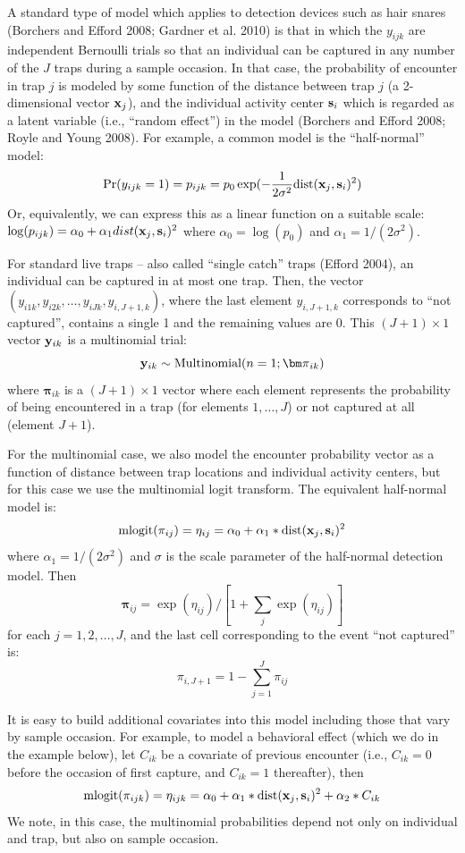 A standard type of model which applies to detection devices such as
hair snares (Borchers and Efford 2008; Gardner et al. 2010) is that in
which the $y_{ijk}$ are independent Bernoulli trials so that an
individual can be captured in any number of the $J$ traps during a
sample occasion.  In that case, the probability of encounter in trap
$j$ is modeled by some function of the distance between trap $j$ (a
2-dimensional vector
${\bf x}_{j}$),  and
the individual activity center ${\bf s}_{i}$ which is regarded as a
latent variable (i.e., ``random effect'') in the model (Borchers and
Efford 2008; Royle and Young 2008). For example, a common model is the
``half-normal'' model:
\[
\Pr(y_{ijk}  = 1) =
p_{ijk} = 
 p_{0} \exp( -\frac{1}{2\sigma^{2}} 
\mbox{dist}({\bf  x}_{j},{\bf s}_{i})^2 )
\]
Or, equivalently,  we can express this as a linear function on a suitable scale:
$\log(p_{ijk}) = \alpha_{0} + \alpha_{1}dist({\bf  x}_{j},{\bf
   s}_{i})^2$
where $\alpha_{0} = \log(p_{0})$ and $\alpha_{1}= 1/(2\sigma^2)$.

For standard live traps -- also called ``single catch'' traps (Efford
2004), an individual can be captured in at most one trap. Then, the
vector $(y_{i1k},y_{i2k},\ldots,y_{iJk},y_{i,J+1,k})$, where the last
element $y_{i,J+1,k}$ corresponds to ``not captured'', contains a
single 1 and the remaining values are 0.  This $(J+1)\times 1$ vector
${\bf y}_{ik}$ is a multinomial trial:
\[
{\bf y}_{ik} \sim \mbox{Multinomial}(n=1; {\bm \pi}_{ik} )
\]
where ${\bm \pi}_{ik}$ is a $(J+1) \times 1$ vector where each element
represents the probability of being encountered in a trap (for
elements $1,\ldots,J$) or not captured at all (element $J+1$).

For the multinomial case, we also model the encounter probability
vector as a function of distance between trap locations and individual
activity centers, but for this case we use the multinomial logit
transform. The equivalent half-normal model is:
\begin{equation}
\mbox{mlogit}(\pi_{ij}) = \eta_{ij}  =  \alpha_0 + \alpha_{1} *
\mbox{dist}({\bf x}_{j},{\bf s}_{i})^2   
\label{eq.logit}
\end{equation}
where $\alpha_{1} = 1/(2\sigma^2)$ and $\sigma$ is the scale
parameter of the half-normal detection model.  Then
\[
{\bm \pi}_{ij} = \exp(\eta_{ij})/[ 1 + \sum_{j} \exp(\eta_{ij}) ]
\]
for each $j=1,2,\ldots,J$, and the last cell corresponding to the
event ``not captured'' is:
\[
\pi_{i,J+1} = 1- \sum_{j=1}^{J} \pi_{ij}
\]

It is easy to build additional covariates into this model including
those that vary by sample occasion. For example, to model a behavioral
effect (which we do in the example below), let 
$C_{ik}$ be a covariate of previous encounter
(i.e., $C_{ik} = 0$ before the occasion of first capture, and $C_{ik}
= 1$ thereafter), then
\[
\mbox{mlogit}(\pi_{ijk}) = \eta_{ijk} = \alpha_{0}  +\alpha_{1}*\mbox{dist}({\bf  x}_{j},{\bf s}_{i})^2 +  \alpha_{2}*C_{ik}
\]
We note, in this case, the multinomial probabilities depend not only
on individual and trap, but also on sample occasion.



